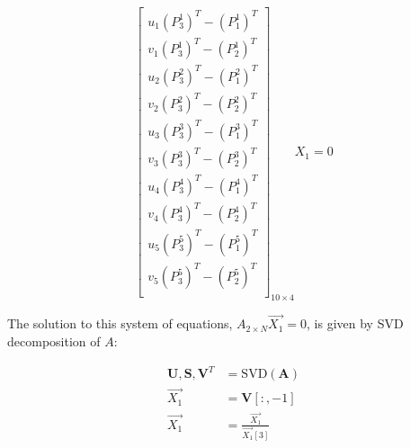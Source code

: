 \documentclass{article}
\begin{document}


\begin{equation*}
    \begin{bmatrix}
    u_1 (P_3^1)^T - (P_1^1)^T \\
    v_1 (P_3^1)^T - (P_2^1)^T \\
    u_2 (P_3^2)^T - (P_1^2)^T \\
    v_2 (P_3^2)^T - (P_2^2)^T \\
    u_3 (P_3^3)^T - (P_1^3)^T \\
    v_3 (P_3^3)^T - (P_2^3)^T \\
    u_4 (P_3^4)^T - (P_1^4)^T \\
    v_4 (P_3^4)^T - (P_2^4)^T \\
    u_5 (P_3^5)^T - (P_1^5)^T \\
    v_5 (P_3^5)^T - (P_2^5)^T \\
    \end{bmatrix}_{10 \times 4}
    {X_1} = 0
\end{equation*}

The solution to this system of equations, $A_{2 \times N} \vec{X_1} = 0$, is given by SVD decomposition of $A$:


\begin{align}
    \mathbf{U}, \mathbf{S}, \mathbf{V}^T &= \mathrm{SVD}(\mathbf{A}) \\
    \vec{X_1} &= \mathbf{V}[:, -1] \\
    \vec{X_1} &= \frac{\vec{X_1}}{\vec{X_1}[3]}
\end{align}
\end{document}
